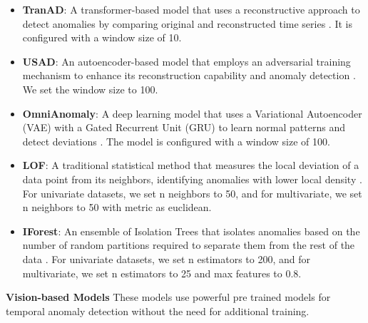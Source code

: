 \documentclass{article}
\theoremstyle{plain}
\theoremstyle{definition}
\theoremstyle{remark}
\begin{document}
\begin{itemize}
    \item \textbf{TranAD}: A transformer-based model that uses a reconstructive approach to detect anomalies by comparing original and reconstructed time series \citep{tuli2022tranad}. It is configured with a window size of 10.
    \item \textbf{USAD}: An autoencoder-based model that employs an adversarial training mechanism to enhance its reconstruction capability and anomaly detection \citep{audibert2020usad}. We set the window size to 100.
    \item \textbf{OmniAnomaly}: A deep learning model that uses a Variational Autoencoder (VAE) with a Gated Recurrent Unit (GRU) to learn normal patterns and detect deviations \citep{su2019robust}. The model is configured with a window size of 100.
    \item \textbf{LOF}: A traditional statistical method that measures the local deviation of a data point from its neighbors, identifying anomalies with lower local density \citep{breunig2000lof}. For univariate datasets, we set n neighbors to 50, and for multivariate, we set n neighbors to 50 with metric as euclidean.
    \item \textbf{IForest}: An ensemble of Isolation Trees that isolates anomalies based on the number of random partitions required to separate them from the rest of the data \citep{liu2008isolation}. For univariate datasets, we set n estimators to 200, and for multivariate, we set n estimators to 25 and max features to 0.8.
\end{itemize}

\textbf{Vision-based Models} These models use powerful pre trained models for temporal anomaly detection without the need for additional training.
\end{document}
